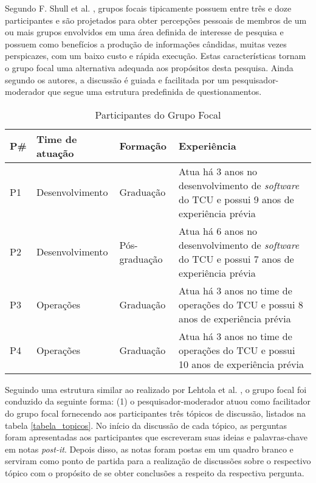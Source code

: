Segundo F. Shull et al. \cite{shull2007guide}, grupos focais tipicamente
possuem entre três e doze participantes e são projetados para obter percepções
pessoais de membros de um ou mais grupos envolvidos em uma área definida de
interesse de pesquisa e possuem como benefícios a produção de informações
cândidas, muitas vezes perspicazes, com um baixo custo e rápida execução.
Estas características tornam o grupo focal uma alternativa adequada aos
propósitos desta pesquisa. Ainda segundo os autores, a discussão é guiada e
facilitada por um pesquisador-moderador que segue uma estrutura predefinida
de questionamentos.

\begin{table}[hb!]
\centering
\caption{Participantes do Grupo Focal}
\label{tabela_participantes_grupo_focal}
\begin{tabular}{|p{1cm}|p{4cm}|p{3cm}|p{7cm}|} \hline
{\bf P\#} & {\bf Time de atuação} & {\bf Formação} & {\bf Experiência}\\ \hline
P1 & Desenvolvimento & Graduação & Atua há 3 anos no desenvolvimento de {\it software} do \acrshort{TCU} e possui 9 anos de experiência prévia \\ \hline
P2 & Desenvolvimento & Pós-graduação & Atua há 6 anos no desenvolvimento de {\it software} do \acrshort{TCU} e possui 7 anos de experiência prévia \\ \hline
P3 & Operações & Graduação & Atua há 3 anos no time de operações do \acrshort{TCU} e possui 8 anos de experiência prévia \\ \hline
P4 & Operações & Graduação & Atua há 3 anos no time de operações do \acrshort{TCU} e possui 10 anos de experiência prévia \\ \hline
\end{tabular}
\end{table}

Seguindo uma estrutura similar ao realizado por Lehtola et al. \cite{requirementes_priorization_in_practice},
o grupo focal foi conduzido da seguinte forma: (1) o pesquisador-moderador atuou
como facilitador do grupo focal fornecendo aos participantes três tópicos de
discussão, listados na tabela \ref{tabela_topicos}. No início da discussão de
cada tópico, as perguntas foram apresentadas aos participantes que escreveram
suas ideias e palavras-chave em notas {\it post-it}. Depois disso, as notas
foram postas em um quadro branco e serviram como ponto de partida para a
realização de discussões sobre o respectivo tópico com o propósito de se obter
conclusões a respeito da respectiva pergunta.

